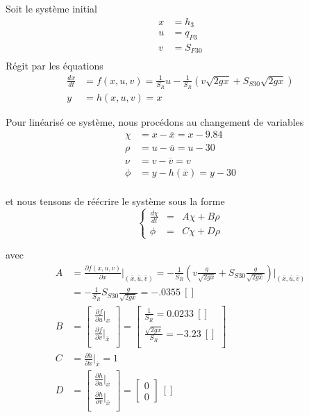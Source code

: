 \documentclass[frenchb, paper=a4, fontsize=11pt]{scrartcl}
\newcommand*\eq[1]{\overline{#1}} 				%
\numberwithin{equation}{section}					%
\numberwithin{figure}{section}					%
\numberwithin{table}{section}						%
\begin{document}
Soit le système initial
\begin{align}
x &= h_3 \\
u &= q_{P3}\\
v &= S_{F30}\\
\end{align}
Régit par les équations
\begin{align}
\frac{dx}{dt} &= f(x,u,v) = \frac{1}{S_R}u - \frac{1}{S_R}(v\sqrt{2gx} + S_{S30}\sqrt{2gx})\\
y &= h(x,u,v) = x
\end{align}

Pour linéarisé ce système, nous procédons au changement de variables
\begin{align}
\chi &= x-\eq{x} = x - 9.84\\
\rho &= u-\eq{u} = u - 30\\
\nu &= v - \eq{v} = v\\
\phi &= y - h(\eq{x}) = y - 30\\
\end{align}


et nous tensons de réécrire le système sous la forme
\begin{equation}
\left\{ \begin{array}{ccc}
\frac{d\chi}{dt} &=& A\chi + B\rho \\
\phi &=& C\chi + D\rho
\end{array}
\right.
\end{equation}

avec 
\begin{align}
A& = \frac{\partial f(x,u,v)}{\partial x}\rvert_{(\eq{x},\eq{u},\eq{v})} = -\frac{1}{S_R}(v\frac{g}{\sqrt{2gx}} + S_{S30}\frac{g}{\sqrt{2gx}})\rvert_{(\eq{x},\eq{u},\eq{v})} \\
&= -\frac{1}{S_R	} S_{S30} \frac{g}{\sqrt{2g\eq{x}}} = \SI{-.0355}{[]}\\
B &=\left[ \begin{array}{l}
 \frac{\partial f}{\partial u}\rvert_{\eq{x}} \\
  \frac{\partial f}{\partial v} \rvert_{\eq{x}}\\
\end{array} \right] 
= \left[ \begin{array}{l}
 \frac{1}{S_R} = \SI{0.0233}{[]}\\
  \frac{\sqrt{2g\eq{x}}}{S_R}= \SI{-3.23}{[]}\\
\end{array} \right] \\
C &= \frac{\partial h}{\partial x}\rvert_{\eq{x}} = \SI{1}{}\\
D&=\left[ \begin{array}{l}
 \frac{\partial h}{\partial u}\rvert_{\eq{x}} \\
  \frac{\partial h}{\partial v} \rvert_{\eq{x}}\\
\end{array} \right]  = \left[ \begin{array}{l}
0\\
0
\end{array} \right] \SI{}{[]}
\end{align}
\end{document}
